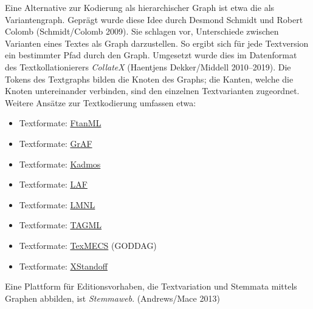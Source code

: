 \documentclass{article}
\begin{document}
        Eine Alternative zur Kodierung als hierarchischer Graph ist etwa die als
                  Variantengraph. Geprägt wurde diese Idee durch Desmond Schmidt und Robert Colomb
                     (Schmidt/Colomb 2009). Sie schlagen vor, Unterschiede zwischen
                  Varianten eines Textes als Graph darzustellen. So ergibt sich für jede Textversion
                  ein bestimmter Pfad durch den Graph. Umgesetzt wurde dies im Datenformat des
                  Textkollationierers \emph{CollateX }(Haentjens Dekker/Middell 2010–2019). Die Tokens des Textgraphs
                  bilden die Knoten des Graphs; die Kanten, welche die Knoten untereinander
                  verbinden, sind den einzelnen Textvarianten zugeordnet. \\
            
        Weitere Ansätze zur Textkodierung umfassen etwa: \\
            
        \begin{itemize}\item {Textformate: \href{http://gams.uni-graz.at/o:konde.184}{FtanML}}\item {Textformate: \href{http://gams.uni-graz.at/o:konde.185}{GrAF}}\item {Textformate: \href{http://gams.uni-graz.at/o:konde.186}{Kadmos}}\item {Textformate: \href{http://gams.uni-graz.at/o:konde.187}{LAF}}\item {Textformate: \href{http://gams.uni-graz.at/o:konde.188}{LMNL}}\item {Textformate: \href{http://gams.uni-graz.at/o:konde.189}{TAGML}}\item {Textformate: \href{http://gams.uni-graz.at/o:konde.190}{TexMECS} (GODDAG)}\item {Textformate: \href{http://gams.uni-graz.at/o:konde.191}{XStandoff}}\end{itemize}Eine Plattform für Editionsvorhaben, die Textvariation und Stemmata mittels
                  Graphen abbilden, ist \emph{Stemmaweb}. (Andrews/Mace
                     2013)\\
            
\end{document}
